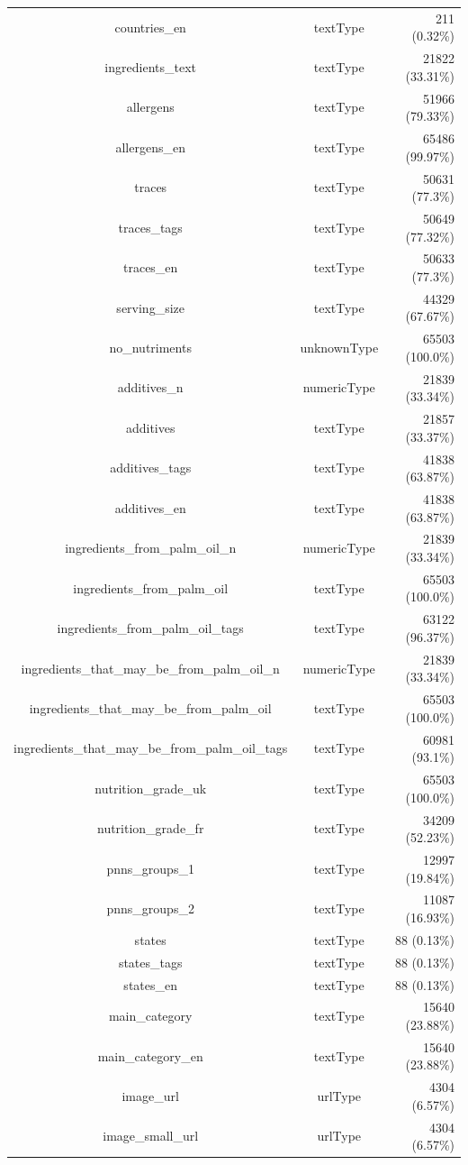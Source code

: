 \documentclass[11pt]{article}
\begin{document}
\begin{center}
\begin{longtable}{|c|c|r|}
countries\_en& textType& 211 (0.32\%)\\
ingredients\_text& textType& 21822 (33.31\%)\\
allergens& textType& 51966 (79.33\%)\\
allergens\_en& textType& 65486 (99.97\%)\\
traces& textType& 50631 (77.3\%)\\
traces\_tags& textType& 50649 (77.32\%)\\
traces\_en& textType& 50633 (77.3\%)\\
serving\_size& textType& 44329 (67.67\%)\\
no\_nutriments& unknownType& 65503 (100.0\%)\\
additives\_n& numericType& 21839 (33.34\%)\\
additives& textType& 21857 (33.37\%)\\
additives\_tags& textType& 41838 (63.87\%)\\
additives\_en& textType& 41838 (63.87\%)\\
ingredients\_from\_palm\_oil\_n& numericType& 21839 (33.34\%)\\
ingredients\_from\_palm\_oil& textType& 65503 (100.0\%)\\
ingredients\_from\_palm\_oil\_tags& textType& 63122 (96.37\%)\\
ingredients\_that\_may\_be\_from\_palm\_oil\_n& numericType& 21839 (33.34\%)\\
ingredients\_that\_may\_be\_from\_palm\_oil& textType& 65503 (100.0\%)\\
ingredients\_that\_may\_be\_from\_palm\_oil\_tags& textType& 60981 (93.1\%)\\
nutrition\_grade\_uk& textType& 65503 (100.0\%)\\
nutrition\_grade\_fr& textType& 34209 (52.23\%)\\
pnns\_groups\_1& textType& 12997 (19.84\%)\\
pnns\_groups\_2& textType& 11087 (16.93\%)\\
states& textType& 88 (0.13\%)\\
states\_tags& textType& 88 (0.13\%)\\
states\_en& textType& 88 (0.13\%)\\
main\_category& textType& 15640 (23.88\%)\\
main\_category\_en& textType& 15640 (23.88\%)\\
image\_url& urlType& 4304 (6.57\%)\\
image\_small\_url& urlType& 4304 (6.57\%)\\

\end{longtable}
\end{center}
\end{document}
